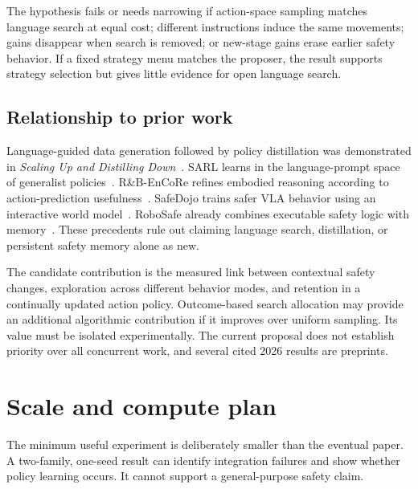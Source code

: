 \documentclass[11pt]{article}
\begin{document}
The hypothesis fails or needs narrowing if action-space sampling matches language search at equal cost; different instructions induce the same movements; gains disappear when search is removed; or new-stage gains erase earlier safety behavior. If a fixed strategy menu matches the proposer, the result supports strategy selection but gives little evidence for open language search.

\subsection{Relationship to prior work}

Language-guided data generation followed by policy distillation was demonstrated in \emph{Scaling Up and Distilling Down}~\cite{scalingup}. SARL learns in the language-prompt space of generalist policies~\cite{sarl}. R\&B-EnCoRe refines embodied reasoning according to action-prediction usefulness~\cite{encore}. SafeDojo trains safer VLA behavior using an interactive world model~\cite{safedojo}. RoboSafe already combines executable safety logic with memory~\cite{robosafe}. These precedents rule out claiming language search, distillation, or persistent safety memory alone as new.

The candidate contribution is the measured link between contextual safety changes, exploration across different behavior modes, and retention in a continually updated action policy. Outcome-based search allocation may provide an additional algorithmic contribution if it improves over uniform sampling. Its value must be isolated experimentally. The current proposal does not establish priority over all concurrent work, and several cited 2026 results are preprints.

\section{Scale and compute plan}

The minimum useful experiment is deliberately smaller than the eventual paper. A two-family, one-seed result can identify integration failures and show whether policy learning occurs. It cannot support a general-purpose safety claim.
\end{document}
